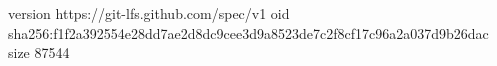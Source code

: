 version https://git-lfs.github.com/spec/v1
oid sha256:f1f2a392554e28dd7ae2d8dc9cee3d9a8523de7c2f8cf17c96a2a037d9b26dac
size 87544
